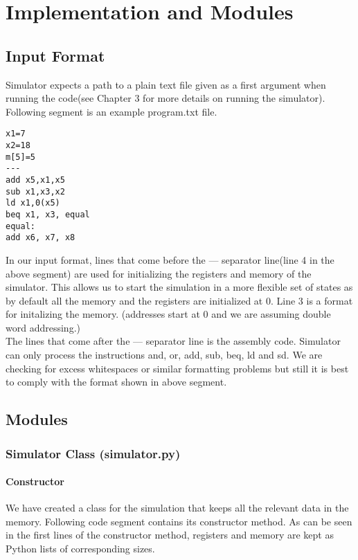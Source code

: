 \chapter{Implementation and Modules}
\section{Input Format}
Simulator expects a path to a plain text file given as a first argument when running the code(see Chapter 3 for more details on running the simulator). Following segment is an example program.txt file.
\vspace{0.5 cm}

\begin{lstlisting}
x1=7
x2=18
m[5]=5
---
add x5,x1,x5
sub x1,x3,x2
ld x1,0(x5)
beq x1, x3, equal
equal:
add x6, x7, x8
\end{lstlisting}
\vspace{0.5 cm}

\noindent In our input format, lines that come before the --- separator line(line 4 in the above segment) are used for initializing the registers and memory of the simulator. This allows us to start the simulation in a more flexible set of states as by default all the memory and the registers are initialized at 0. Line 3 is a format for initalizing the memory. (addresses start at 0 and we are assuming double word addressing.)
\\

\noindent The lines that come after the --- separator line is the assembly code. Simulator can only process the instructions and, or, add, sub, beq, ld and sd. We are checking for excess whitespaces or similar formatting problems but still it is best to comply with the format shown in above segment.

\section{Modules}
\subsection{Simulator Class (simulator.py)}
\subsubsection{Constructor}
We have created a class for the simulation that keeps all the relevant data in the memory. Following code segment contains its constructor method. As can be seen in the first lines of the constructor method, registers and memory are kept as Python lists of corresponding sizes. \\

